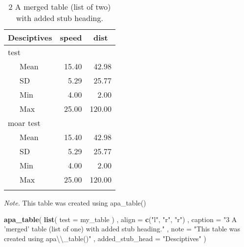 \documentclass[english,man]{apa6}
\newenvironment{Shaded}{\begin{snugshade}}{\end{snugshade}}
\newcommand{\KeywordTok}[1]{\textcolor[rgb]{0.13,0.29,0.53}{\textbf{#1}}}
\newcommand{\DataTypeTok}[1]{\textcolor[rgb]{0.13,0.29,0.53}{#1}}
\newcommand{\CharTok}[1]{\textcolor[rgb]{0.31,0.60,0.02}{#1}}
\newcommand{\StringTok}[1]{\textcolor[rgb]{0.31,0.60,0.02}{#1}}
\newcommand{\NormalTok}[1]{#1}
\theoremstyle{definition}
\theoremstyle{definition}
\theoremstyle{definition}
\theoremstyle{remark}
\begin{document}
\begin{table}[tbp]
\begin{center}
\begin{threeparttable}
\caption{\label{tab:unnamed-chunk-3}2 A merged table (list of two) with added stub heading.}
\begin{tabular}{lrr}
\toprule
Desciptives & \multicolumn{1}{c}{speed} & \multicolumn{1}{c}{dist}\\
\midrule
test &  & \\
\ \ \ Mean & 15.40 & 42.98\\
\ \ \ SD & 5.29 & 25.77\\
\ \ \ Min & 4.00 & 2.00\\
\ \ \ Max & 25.00 & 120.00\\
moar test &  & \\
\ \ \ Mean & 15.40 & 42.98\\
\ \ \ SD & 5.29 & 25.77\\
\ \ \ Min & 4.00 & 2.00\\
\ \ \ Max & 25.00 & 120.00\\
\bottomrule
\addlinespace
\end{tabular}
\begin{tablenotes}[para]
\textit{Note.} This table was created using apa\_table()
\end{tablenotes}
\end{threeparttable}
\end{center}
\end{table}

\begin{Shaded}
\begin{Highlighting}[]
\KeywordTok{apa_table}\NormalTok{(}
  \KeywordTok{list}\NormalTok{(}
    \DataTypeTok{test =}\NormalTok{ my_table}
\NormalTok{  )}
\NormalTok{  , }\DataTypeTok{align =} \KeywordTok{c}\NormalTok{(}\StringTok{"l"}\NormalTok{, }\StringTok{"r"}\NormalTok{, }\StringTok{"r"}\NormalTok{)}
\NormalTok{  , }\DataTypeTok{caption =} \StringTok{"3 A 'merged' table (list of one) with added stub heading."}
\NormalTok{  , }\DataTypeTok{note =} \StringTok{"This table was created using apa}\CharTok{\textbackslash{}\textbackslash{}}\StringTok{_table()"}
\NormalTok{  , }\DataTypeTok{added_stub_head =} \StringTok{"Desciptives"}
\NormalTok{)}
\end{Highlighting}
\end{Shaded}
\end{document}
